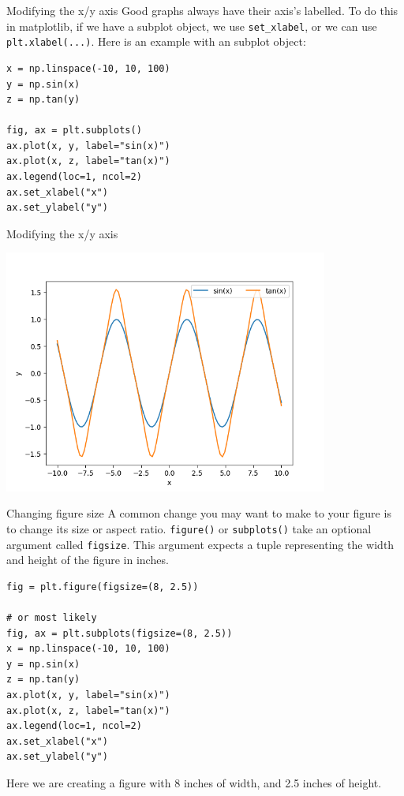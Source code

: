 \documentclass[10pt]{beamer}
\begin{document}
\begin{frame}[label={sec:orgb81f857},fragile]{Modifying the x/y axis}
 Good graphs always have their axis's labelled. To do this in matplotlib, if we
have a subplot object, we use \texttt{set\_xlabel}, or we can use \texttt{plt.xlabel(...)}. Here is
an example with an subplot object:

\begin{verbatim}
x = np.linspace(-10, 10, 100)
y = np.sin(x)
z = np.tan(y)

fig, ax = plt.subplots()
ax.plot(x, y, label="sin(x)")
ax.plot(x, z, label="tan(x)")
ax.legend(loc=1, ncol=2)
ax.set_xlabel("x")
ax.set_ylabel("y")
\end{verbatim}
\end{frame}

\begin{frame}[label={sec:org2961c67}]{Modifying the x/y axis}
\begin{center}
\includegraphics[width=0.8\textwidth]{images/axis.png}
\end{center}
\end{frame}

\begin{frame}[label={sec:org89bd78b},fragile]{Changing figure size}
 A common change you may want to make to your figure is to change its size or
aspect ratio. \texttt{figure()} or \texttt{subplots()} take an optional argument called
\texttt{figsize}. This argument expects a tuple representing the width and height of the
figure in inches.

\begin{verbatim}
fig = plt.figure(figsize=(8, 2.5))

# or most likely
fig, ax = plt.subplots(figsize=(8, 2.5))
x = np.linspace(-10, 10, 100)
y = np.sin(x)
z = np.tan(y)
ax.plot(x, y, label="sin(x)")
ax.plot(x, z, label="tan(x)")
ax.legend(loc=1, ncol=2)
ax.set_xlabel("x")
ax.set_ylabel("y")
\end{verbatim}

Here we are creating a figure with 8 inches of width, and 2.5 inches of height.
\end{frame}
\end{document}
